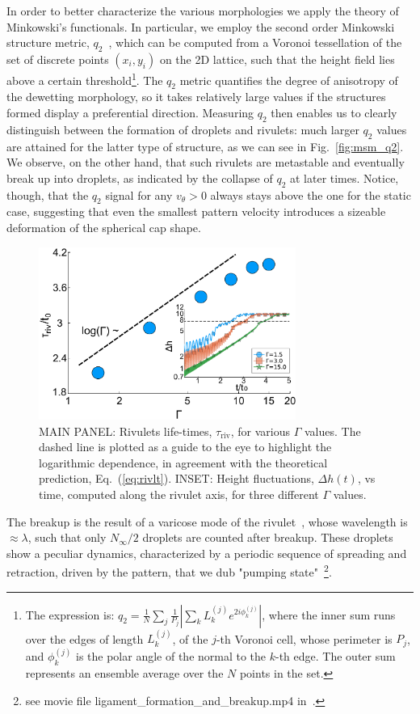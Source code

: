 In order to better characterize the various morphologies we apply the theory of Minkowski's functionals. 
In particular, we employ the second order Minkowski structure metric, $q_2$~\cite{doi:10.1063/1.4774084, Schaller2020}, which can be computed from a Voronoi tessellation of the set of discrete points $(x_i, y_i)$ on the 2D lattice, such that the height field lies above a certain threshold\footnote{The expression is: $q_2 = \frac{1}{N}\sum_j \frac{1}{P_j}|\sum_k L^{(j)}_k e^{2i\phi^{(j)}_k}|$, where the inner sum runs over the edges of length $L^{(j)}_k$, of the $j$-th Voronoi cell, whose perimeter is $P_j$, and $\phi^{(j)}_k$ is the polar angle of the normal to the $k$-th edge. 
The outer sum represents an ensemble average over the $N$ points in the set.}. The $q_2$ metric quantifies the degree of anisotropy of the dewetting morphology, so it takes relatively large values if the structures formed display a preferential direction. 
Measuring $q_2$ then enables us to clearly distinguish between the formation of droplets and rivulets: much larger $q_2$ values are attained for the latter type of structure, as we can see in Fig.~\ref{fig:msm_q2}.
We observe, on the other hand, that such rivulets are metastable and eventually break up into droplets, as indicated by the collapse of $q_2$ at later times. 
Notice, though, that the $q_2$ signal for any $v_{\theta} >0$ always stays above the one for the static case, suggesting that even the smallest pattern velocity introduces a sizeable deformation of the spherical cap shape.
\begin{figure}
    \centering
    \includegraphics[width=0.75\textwidth]{graphics/Figure_5.pdf}
    \caption{MAIN PANEL: Rivulets life-times, $\tau_{\text{riv}}$, for various $\Gamma$ values.
    The dashed line is plotted as a guide to the eye to highlight the logarithmic dependence, in agreement with 
    the theoretical prediction, Eq.~(\ref{eq:rivlt}).
    INSET: Height fluctuations, $\Delta h(t)$, vs time, computed along the rivulet axis, for three different $\Gamma$ values.
    }
    \label{fig:stab_ligs_lam2}
\end{figure}
The breakup is the result of a varicose mode of the rivulet~\cite{doi:10.1063/1.3211248, PhysRevE.77.061605}, whose wavelength is $\approx\lambda$, such that only $N_{\infty}/2$ droplets are counted after breakup. 
These droplets show a peculiar dynamics, characterized by a periodic sequence of spreading and retraction, driven by the pattern, that we dub "pumping state"~\footnote{see movie file ligament\_formation\_and\_breakup.mp4 in~\cite{SuppMat}.}.

